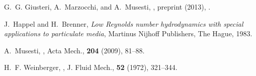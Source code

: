 \documentclass[final]{amsart}
\theoremstyle{definition}
\theoremstyle{definition}
\theoremstyle{remark}
\begin{document}
\begin{thebibliography}{10}
\newblock G.~G. Giusteri, A.~Marzocchi, and A.~Musesti,
, preprint (2013),
.

\newblock J.~Happel and H.~Brenner,
\newblock \textit{Low {R}eynolds number hydrodynamics with special applications to
  particulate media},
\newblock Martinus Nijhoff Publishers, The Hague, 1983.

\newblock A.~Musesti,
,
\newblock Acta Mech., {\bf 204} (2009), 81--88.

H.~F. Weinberger,
,
\newblock J. Fluid Mech., {\bf 52} (1972), 321--344.

\end{thebibliography}
\end{document}
